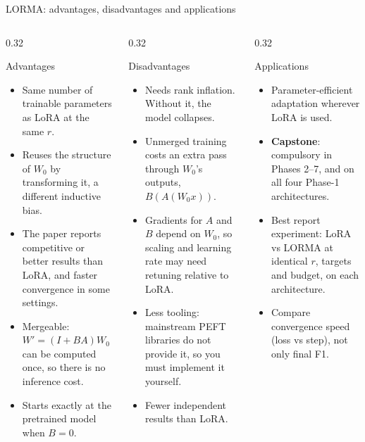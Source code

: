 \documentclass[aspectratio=169,11pt]{beamer}
\begin{document}
\begin{frame}{LORMA: advantages, disadvantages and applications}
  \begin{columns}[T]
    \begin{column}{0.32\textwidth}
      \begin{exampleblock}{Advantages}
        \scriptsize
        \begin{itemize}
          \item Same number of trainable parameters as LoRA at the same $r$.
          \item Reuses the structure of $W_0$ by transforming it, a different inductive bias.
          \item The paper reports competitive or better results than LoRA, and faster convergence in some settings.
          \item Mergeable: $W'=(I+BA)W_0$ can be computed once, so there is no inference cost.
          \item Starts exactly at the pretrained model when $B=0$.
        \end{itemize}
      \end{exampleblock}
    \end{column}
    \begin{column}{0.32\textwidth}
      \begin{alertblock}{Disadvantages}
        \scriptsize
        \begin{itemize}
          \item Needs rank inflation. Without it, the model collapses.
          \item Unmerged training costs an extra pass through $W_0$'s outputs, $B(A(W_0x))$.
          \item Gradients for $A$ and $B$ depend on $W_0$, so scaling and learning rate may need retuning relative to LoRA.
          \item Less tooling: mainstream PEFT libraries do not provide it, so you must implement it yourself.
          \item Fewer independent results than LoRA.
        \end{itemize}
      \end{alertblock}
    \end{column}
    \begin{column}{0.32\textwidth}
      \begin{block}{Applications}
        \scriptsize
        \begin{itemize}
          \item Parameter-efficient adaptation wherever LoRA is used.
          \item \textbf{Capstone}: \alert{compulsory} in Phases 2--7, and on all four Phase-1 architectures.
          \item Best report experiment: LoRA vs LORMA at identical $r$, targets and budget, on each architecture.
          \item Compare convergence speed (loss vs step), not only final F1.
        \end{itemize}
      \end{block}
    \end{column}
  \end{columns}
\end{frame}
\end{document}
